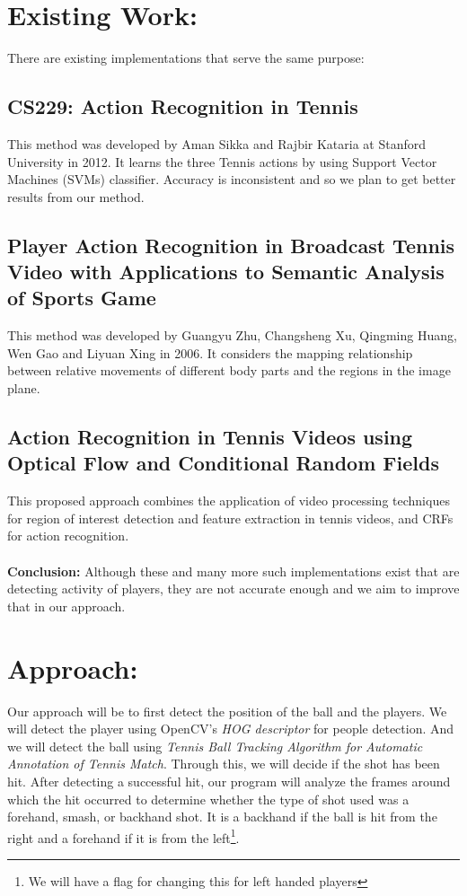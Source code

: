 \documentclass[10.5pt]{article}
\begin{document}
    \section{Existing Work:}
    There are existing implementations that serve the same purpose:
    \subsection{CS229: Action Recognition in Tennis\cite{stanford2012}}
        This method was developed by Aman Sikka and Rajbir Kataria at Stanford University in 2012. It learns the three Tennis actions by using Support Vector Machines (SVMs) classifier. Accuracy is inconsistent and so we plan to get better results from our method.
    \subsection{Player Action Recognition in Broadcast Tennis Video with Applications to Semantic Analysis of Sports Game\cite{asians}}
    This method was developed by Guangyu Zhu, Changsheng Xu, Qingming Huang, Wen Gao and Liyuan Xing in 2006. It considers the mapping relationship between relative movements of different body parts and the regions in the image plane.
    \subsection{Action Recognition in Tennis Videos using Optical Flow and Conditional Random Fields\cite{argentina}}
    This proposed approach combines the application of video processing techniques for region of interest detection and feature extraction in tennis videos, and CRFs for action recognition.\\
    \\
\textbf{Conclusion:} Although these and many more such implementations exist that are detecting activity of players, they are not accurate enough and we aim to improve that in our approach.
    \section{Approach:}
    Our approach will be to first detect the position of the ball and the players. We will detect the player using OpenCV's \textit{HOG descriptor}\cite{hog} for people detection. And we will detect the ball using \textit{Tennis Ball Tracking Algorithm for Automatic Annotation of Tennis Match}\cite{surrey}. Through this, we will decide if the shot has been hit. After detecting a successful hit, our program will analyze the frames around which the hit occurred to determine whether the type of shot used was a forehand, smash, or backhand shot. It is a backhand if the ball is hit from the right and a forehand if it is from the left\footnote{We will have a flag for changing this for left handed players}.
    
\end{document}
